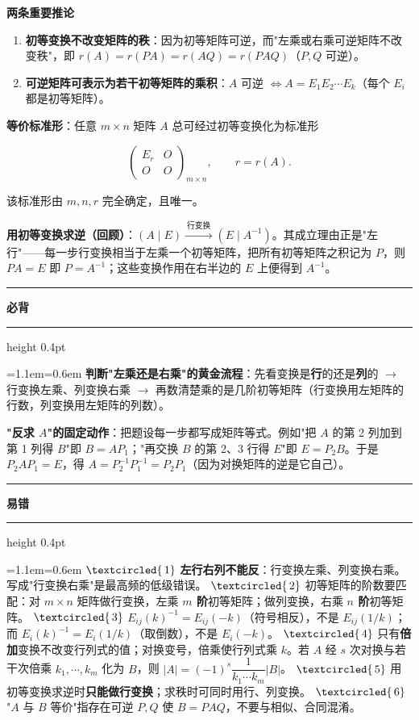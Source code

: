 \documentclass[11pt,openany,UTF8]{ctexbook}
\newcommand{\circled}[1]{\textcircled{\scriptsize\,#1}}
\newcommand{\callouthead}[2]{%
  \par\addvspace{7pt}\noindent
  {\color{#1}\rule[-0.15em]{3pt}{1.05em}}\hspace{0.5em}%
  {\bfseries\color{#1}#2}\par\nobreak\vspace{-0.35em}%
  {\color{rulesep}\hrule height 0.4pt}\nobreak\vspace{0.45em}%
  \begingroup\small\setlength{\parindent}{0pt}%
  \leftskip=1.1em\rightskip=0.6em\noindent\ignorespaces}
\newcommand{\calloutend}{\par\endgroup\addvspace{7pt}}
\newenvironment{callkey}[1]{\callouthead{keybar}{#1}}{\calloutend}
\newenvironment{callwarn}[1]{\callouthead{warnbar}{#1}}{\calloutend}
\begin{document}
\textbf{两条重要推论}

\begin{enumerate}
\item \textbf{初等变换不改变矩阵的秩}：因为初等矩阵可逆，而"左乘或右乘可逆矩阵不改变秩"，即 $r(A)=r(PA)=r(AQ)=r(PAQ)$（$P,Q$ 可逆）。
\item \textbf{可逆矩阵可表示为若干初等矩阵的乘积}：$A$ 可逆 $\iff A=E_1E_2\cdots E_k$（每个 $E_i$ 都是初等矩阵）。
\end{enumerate}
\textbf{等价标准形}：任意 $m\times n$ 矩阵 $A$ 总可经过初等变换化为标准形

\[\begin{pmatrix}E_r&O\\O&O\end{pmatrix}_{m\times n},\qquad r=r(A).\]

该标准形由 $m,n,r$ 完全确定，且唯一。

\textbf{用初等变换求逆（回顾）}：$(A\mid E)\xrightarrow{\ \text{行变换}\ }(E\mid A^{-1})$。其成立理由正是"左行"——每一步行变换相当于左乘一个初等矩阵，把所有初等矩阵之积记为 $P$，则 $PA=E$ 即 $P=A^{-1}$；这些变换作用在右半边的 $E$ 上便得到 $A^{-1}$。

\begin{callkey}{必背}
\textbf{判断"左乘还是右乘"的黄金流程}：先看变换是\textbf{行}的还是\textbf{列}的 $\to$ 行变换左乘、列变换右乘 $\to$ 再数清楚乘的是几阶初等矩阵（行变换用左矩阵的行数，列变换用左矩阵的列数）。

\textbf{"反求 $A$"的固定动作}：把题设每一步都写成矩阵等式。例如"把 $A$ 的第 2 列加到第 1 列得 $B$"即 $B=AP_1$；"再交换 $B$ 的第 2、3 行得 $E$"即 $E=P_2B$。于是 $P_2AP_1=E$，得 $A=P_2^{-1}P_1^{-1}=P_2P_1$（因为对换矩阵的逆是它自己）。

\end{callkey}

\begin{callwarn}{易错}
$\circled{1}$ \textbf{左行右列不能反}：行变换左乘、列变换右乘。写成"行变换右乘"是最高频的低级错误。 $\circled{2}$ 初等矩阵的阶数要匹配：对 $m\times n$ 矩阵做行变换，左乘 \textbf{$m$ 阶}初等矩阵；做列变换，右乘 \textbf{$n$ 阶}初等矩阵。 $\circled{3}$ $E_{ij}(k)^{-1}=E_{ij}(-k)$（符号相反），不是 $E_{ij}(1/k)$；而 $E_i(k)^{-1}=E_i(1/k)$（取倒数），不是 $E_i(-k)$。 $\circled{4}$ 只有\textbf{倍加}变换不改变行列式的值；对换变号，倍乘使行列式乘 $k$。若 $A$ 经 $s$ 次对换与若干次倍乘 $k_1,\cdots,k_m$ 化为 $B$，则 $\vert A\vert=(-1)^s\dfrac{1}{k_1\cdots k_m}\vert B\vert$。 $\circled{5}$ 用初等变换求逆时\textbf{只能做行变换}；求秩时可同时用行、列变换。 $\circled{6}$ "$A$ 与 $B$ 等价"指存在可逆 $P,Q$ 使 $B=PAQ$，不要与相似、合同混淆。

\end{callwarn}
\end{document}
